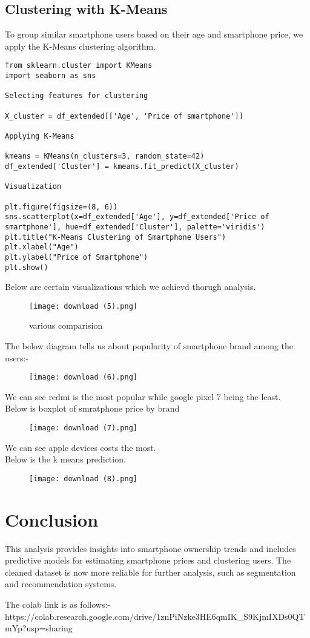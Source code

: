 \documentclass[12pt]{article}
\begin{document}
\subsection{Clustering with K-Means}
To group similar smartphone users based on their age and smartphone price, we apply the K-Means clustering algorithm.

\begin{verbatim}
from sklearn.cluster import KMeans
import seaborn as sns

Selecting features for clustering

X_cluster = df_extended[['Age', 'Price of smartphone']]

Applying K-Means

kmeans = KMeans(n_clusters=3, random_state=42)
df_extended['Cluster'] = kmeans.fit_predict(X_cluster)

Visualization

plt.figure(figsize=(8, 6))
sns.scatterplot(x=df_extended['Age'], y=df_extended['Price of smartphone'], hue=df_extended['Cluster'], palette='viridis')
plt.title("K-Means Clustering of Smartphone Users")
plt.xlabel("Age")
plt.ylabel("Price of Smartphone")
plt.show()
\end{verbatim}


Below are certain visualizations which we achievd thorugh analysis.\\
\begin{figure}[H]
    \centering
    \texttt{[image: download (5).png]} 
    \caption{various comparision}
    \label{fig:example-image}
\end{figure}
The below diagram tells us about popularity of smartphone brand among the users:-\\
\begin{figure}[H]
    \centering
    \texttt{[image: download (6).png]} 
    \caption{}
    \label{fig:example-image}
\end{figure}
We can see redmi is the most popular while google pixel 7 being the least.\\
Below is boxplot of smratphone price by brand
\begin{figure}[H]
    \centering
    \texttt{[image: download (7).png]} 
    \caption{}
    \label{fig:example-image}
\end{figure}
We can see apple devices costs the most.\\
Below is the k means prediction.\\
\begin{figure}[H]
    \centering
    \texttt{[image: download (8).png]} 
    \caption{}
    \label{fig:example-image}
\end{figure}
\section{Conclusion}
This analysis provides insights into smartphone ownership trends and includes predictive models for estimating smartphone prices and clustering users. The cleaned dataset is now more reliable for further analysis, such as segmentation and recommendation systems.

The colab link is as follows:-https://colab.research.google.com/drive/1znPiNzke3HE6qmIK_S9KjmIXDs0QTmYp?usp=sharing
\end{document}
